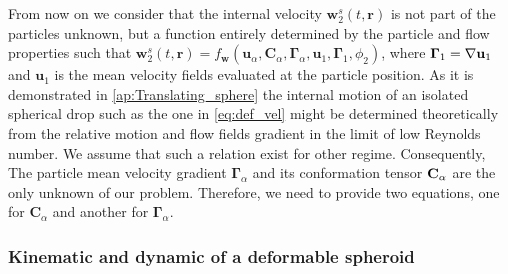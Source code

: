 From now on we consider that the internal velocity $\textbf{w}^{s}_2(t,\textbf{r})$ is not part of the particles unknown, but a function entirely determined by the particle and flow properties such that $\textbf{w}^{s}_2(t,\textbf{r}) =f_\textbf{w}(\textbf{u}_\alpha,\textbf{C}_\alpha,\bm\Gamma_\alpha,\textbf{u}_1,\bm \Gamma_1,\phi_2) $, where $\bm\Gamma_1 = \mathbf{\nabla} \textbf{u}_1$ and $\textbf{u}_1$ is the mean velocity fields evaluated at the particle position. 
As it is demonstrated in \ref{ap:Translating_sphere} the internal motion of an isolated spherical drop such as the one in \ref{eq:def_vel} might be determined theoretically from the relative motion and flow fields gradient in the limit of low Reynolds number.
We assume that such a relation exist for other regime. 
Consequently, The particle mean velocity gradient $\bm\Gamma_\alpha$ and its conformation tensor $\textbf C_\alpha$ are the only unknown of our problem. 
Therefore, we need to provide two equations, one for $\textbf{C}_\alpha$ and another for $\bm\Gamma_\alpha$. 

\subsubsection*{Kinematic and dynamic of a deformable spheroid}

